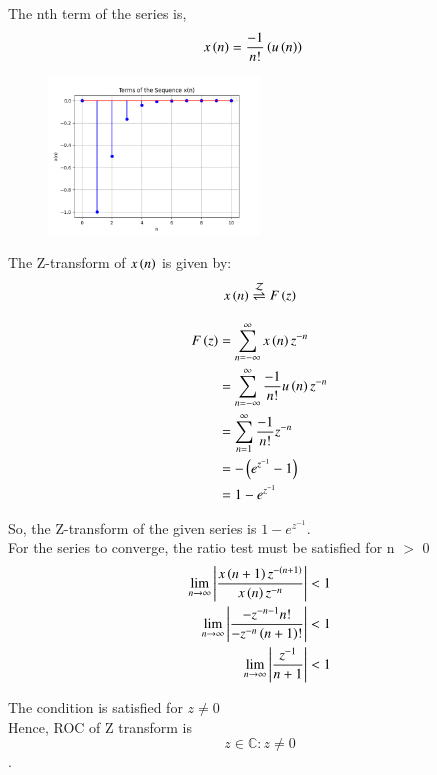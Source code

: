 \documentclass[journal,12pt,twocolumn]{IEEEtran}
\begin{document}
The nth term of the series is,
\begin{align*}
    x \left(n\right) & = \frac{-1}{n!}  \left(u \left(n\right)\right)
\end{align*}

\begin{figure}
  \centering
  \includegraphics[width=0.5\textwidth]{plot.png}
\end{figure}

The Z-transform of $ x \left(n\right) $ is given by:
$$x \left(n\right) \overset{\mathcal{Z}}{ \rightleftharpoons} F \left(z\right)$$

\begin{align*}
    F \left(z\right) & = \sum_{n=-\infty}^{\infty} x \left(n\right)   z^{-n} \\
    & = \sum_{n=-\infty}^{\infty} \frac{-1}{n!}  u \left(n\right)   z^{-n} \\
    & = \sum_{n=1}^{\infty} \frac{-1}{n!}   z^{-n} \\
    & = -  \left(e^{z^{-1}} - 1\right) \\
    & = 1 - e^{z^{-1}}
\end{align*}

So, the Z-transform of the given series is
$ 1 - e^{z^{-1}} $.\\


For the series to converge, the ratio test must be satisfied for n $>$ 0
\begin{align*}
 \lim_{{n \to \infty}}  \left| \frac{x \left(n+1\right) z^{- \left(n+1\right)}}{x \left(n\right) z^{-n}}  \right| & <  1 \\
\lim_{{n \to \infty}}  \left| \frac{-z^{-n-1} n!}{-z^{-n}  \left(n+1\right)!} \right| & < 1\\
\lim_{{n \to \infty}}  \left| \frac{z^{-1}}{n+1}  \right| & < 1\\
\end{align*}

The condition is satisfied for $ z \neq 0 $ \\

Hence, ROC of Z transform is $$z\in\mathbb{C} : z \neq 0$$.
\end{document}
